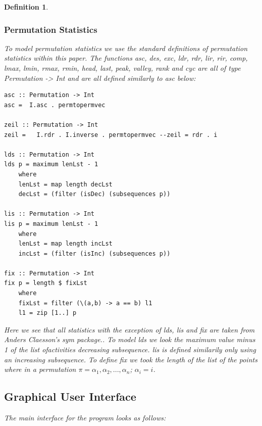 \documentclass[12pt]{article}
\newtheorem{definition}{Definition}
\begin{document}
\begin{definition}
\subsubsection{Permutation Statistics}
To model permutation statistics we use the standard definitions of permutation statistics within this paper. The functions asc, des, exc, ldr, rdr, lir, rir, comp, lmax, lmin, rmax, rmin, head, last, peak, valley, rank and cyc are all of type {\it Permutation -> Int} and are all defined similarly to asc below:
\begin{lstlisting}
asc :: Permutation -> Int
asc =  I.asc . permtopermvec

zeil :: Permutation -> Int
zeil =   I.rdr . I.inverse . permtopermvec --zeil = rdr . i 

lds :: Permutation -> Int
lds p = maximum lenLst - 1
	where
	lenLst = map length decLst 
	decLst = (filter (isDec) (subsequences p))
	
lis :: Permutation -> Int
lis p = maximum lenLst - 1
	where
	lenLst = map length incLst 
	incLst = (filter (isInc) (subsequences p))

fix :: Permutation -> Int
fix p = length $ fixLst 
	where
	fixLst = filter (\(a,b) -> a == b) l1
	l1 = zip [1..] p	
\end{lstlisting}
Here we see that all statistics with the exception of lds, lis and fix are taken from Anders Claesson's {\it sym} package.\cite{ClaessonSym}. To model {\it lds} we look the maximum value minus 1 of the list ofactivities decreasing subsequence. {\it lis} is defined similarily only using an increasing subsequence. To define {\it fix} we took the length of the list of the points where in a permutation $\pi = \alpha_1, \alpha_2, ..., \alpha_n$; $\alpha_i = i$.


\subsection{Graphical User Interface}
The main interface for the program looks as follows:\\


\end{definition}
\end{document}
